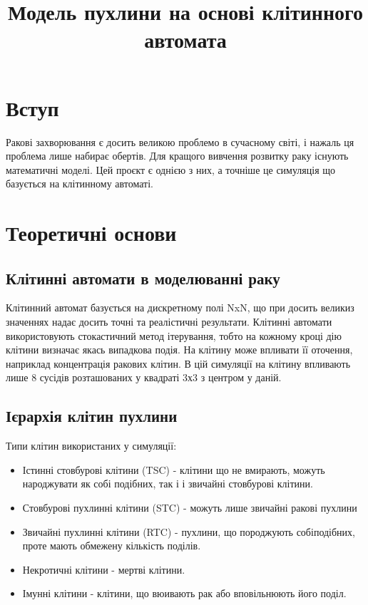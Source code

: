 \documentclass{article}
\title{Модель пухлини на основі клітинного автомата}
\date{}
\begin{document}
\maketitle

\tableofcontents

\newpage

\section{Вступ}
Ракові захворювання є досить великою проблемо в сучасному світі, і нажаль ця проблема лише набирає обертів. Для кращого вивчення розвитку раку існують математичні моделі. Цей проєкт є однією з них, а точніше це симуляція що базується на клітинному автоматі.

\section{Теоретичні основи}
\subsection{Клітинні автомати в моделюванні раку}
Клітинний автомат базується на дискретному полі NxN, що при досить великиз значеннях надає досить точні та реалістичні результати. Клітинні автомати використовують стокастичний метод ітерування, тобто на кожному кроці дію клітини визначає якась випадкова подія. На клітину може впливати її оточення, наприклад концентрація ракових клітин. В цій симуляції на клітину впливають лише 8 сусідів розташованих у квадраті 3х3 з центром у даній.

\subsection{Ієрархія клітин пухлини}
Типи клітин використаних у симуляції:
\begin{itemize}
    \item Істинні стовбурові клітини (TSC) - клітини що не вмирають, можуть народжувати як собі подібних, так і і звичайні стовбурові клітини.
    \item Стовбурові пухлинні клітини (STC) - можуть лише звичайні ракові пухлини
    \item Звичайні пухлинні клітини (RTC) - пухлини, що породжують собіподібних, проте мають обмежену кількість поділів.
    \item Некротичні клітини - мертві клітини.
    \item Імунні клітини - клітини, що вюивають рак або вповільнюють його поділ.
\end{itemize}
\end{document}
